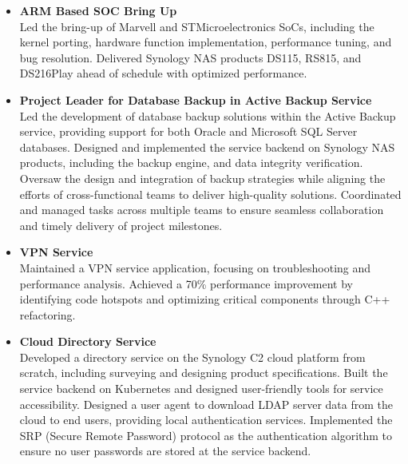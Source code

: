 \documentclass{res}
\begin{document}
\begin{resume}
\begin{itemize}
   \item {\bf ARM Based SOC Bring Up}\vspace{3pt}\\
   Led the bring-up of Marvell and STMicroelectronics SoCs, including the kernel porting, hardware function implementation, performance tuning, and bug resolution.
   Delivered Synology NAS products DS115, RS815, and DS216Play ahead of schedule with optimized performance.

   \item {\bf Project Leader for Database Backup in Active Backup Service}\vspace{3pt}\\
   Led the development of database backup solutions within the Active Backup service, providing support for both Oracle and Microsoft SQL Server databases.
   Designed and implemented the service backend on Synology NAS products, including the backup engine, and data integrity verification.
   Oversaw the design and integration of backup strategies while aligning the efforts of cross-functional teams to deliver high-quality solutions.
   Coordinated and managed tasks across multiple teams to ensure seamless collaboration and timely delivery of project milestones.

   \item {\bf VPN Service}\vspace{3pt}\\
   Maintained a VPN service application, focusing on troubleshooting and performance analysis. Achieved a 70\% performance improvement by identifying code hotspots and optimizing critical components through C++ refactoring.

   \item {\bf Cloud Directory Service}\vspace{3pt}\\
   Developed a directory service on the Synology C2 cloud platform from scratch, including surveying and designing product specifications. Built the service backend on Kubernetes and designed user-friendly tools for service accessibility.
   Designed a user agent to download LDAP server data from the cloud to end users, providing local authentication services.
   Implemented the SRP (Secure Remote Password) protocol as the authentication algorithm to ensure no user passwords are stored at the service backend.

\end{itemize}

\vspace{0.2in}

\end{resume}
\end{document}
